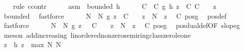 \begin{isabellebody}
\ \ \isamarkupfalse%
\ {\isacharparenleft}{\kern0pt}rule\ ccontr{\isacharparenright}{\kern0pt}\isanewline
\ \ \ \ \isamarkupfalse%
\ asm{\isacharcolon}{\kern0pt}\ {\isachardoublequoteopen}{\isasymnot}\ bounded\ h{\isachardoublequoteclose}\isanewline
\ \ \ \ \isamarkupfalse%
\ C\ \ C{\isacharcolon}{\kern0pt}\ {\isachardoublequoteopen}{\isasymbar}g\ {\isacharparenleft}{\kern0pt}h\ z{\isacharparenright}{\kern0pt}{\isasymbar}\ {\isasymle}\ C{\isachardoublequoteclose}\ {\isachardoublequoteopen}C\ {\isasymge}\ {}{\isachardoublequoteclose}\ \ z\ \isamarkupfalse%
\ bounded\ \isamarkupfalse%
\ fastforce\isanewline
\ \ \ \ \isamarkupfalse%
\ N\ \ N{\isacharcolon}{\kern0pt}\ {\isachardoublequoteopen}g\ z\ {\isasymge}\ C\ {\isacharplus}{\kern0pt}\ {}{\isachardoublequoteclose}\ \ {\isachardoublequoteopen}z\ {\isasymge}\ N{\isachardoublequoteclose}\ \ z\ \isamarkupfalse%
\ C\ pos{\isacharunderscore}{\kern0pt}g\ \isamarkupfalse%
\ pos{\isacharunderscore}{\kern0pt}def\ \isamarkupfalse%
\ fastforce\isanewline
\ \ \ \ \isamarkupfalse%
\ N{\isacharprime}{\kern0pt}\ \ N{\isacharprime}{\kern0pt}{\isacharcolon}{\kern0pt}\ {\isachardoublequoteopen}g\ z\ {\isasymle}\ {\isacharminus}{\kern0pt}\ {\isacharparenleft}{\kern0pt}C\ {\isacharplus}{\kern0pt}\ {}{\isacharparenright}{\kern0pt}{\isachardoublequoteclose}\ \ {\isachardoublequoteopen}z\ {\isasymle}\ N{\isacharprime}{\kern0pt}{\isachardoublequoteclose}\ \ z\ \isamarkupfalse%
\ C\ pos{\isacharunderscore}{\kern0pt}g\ \isamarkupfalse%
\ pos{\isacharunderscore}{\kern0pt}dual{\isacharunderscore}{\kern0pt}def{\isacharbrackleft}{\kern0pt}OF\ slope{\isacharunderscore}{\kern0pt}g{\isacharbrackright}{\kern0pt}\ \isamarkupfalse%
\ {\isacharparenleft}{\kern0pt}meson\ add{\isacharunderscore}{\kern0pt}increasing{}\ linordered{\isacharunderscore}{\kern0pt}nonzero{\isacharunderscore}{\kern0pt}semiring{\isacharunderscore}{\kern0pt}class{\isachardot}{\kern0pt}zero{\isacharunderscore}{\kern0pt}le{\isacharunderscore}{\kern0pt}one{\isacharparenright}{\kern0pt}\isanewline
\ \ \ \ \isamarkupfalse%
\ z\ \ {\isachardoublequoteopen}{\isasymbar}h\ z{\isasymbar}\ {\isachargreater}{\kern0pt}\ max\ {\isasymbar}N{\isasymbar}\ {\isasymbar}N{\isacharprime}{\kern0pt}{\isasymbar}{\isachardoublequoteclose}\ \isamarkupfalse%

\end{isabellebody}
